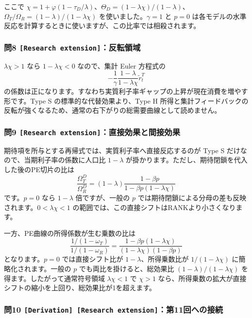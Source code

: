 \documentclass[
  japanese,
  lualatex,
  ja=standard,
  11pt,
  a4paper]{ltjsarticle}
\begin{document}
ここで
\(\chi=1+\varphi(1-\tau_D/\lambda)\)、\(\Theta_D=(1-\lambda\chi)/(1-\lambda)\)、\(\Omega_T/\Omega_R=(1-\lambda)/(1-\lambda\chi)\)
を使いました。\(\gamma=1\) と \(p=0\)
は各モデルの水準反応を計算するときに使いますが、この比率では相殺されます。

\subsubsection{\texorpdfstring{問8
\texttt{{[}Research\ extension{]}}：反転領域}{問8 {[}Research extension{]}：反転領域}}\label{ux554f8-research-extensionux53cdux8ee2ux9818ux57df}

\(\lambda\chi>1\) なら \(1-\lambda\chi<0\) なので、集計 Euler 方程式の
\[
-\frac1\gamma\frac{1-\lambda}{1-\lambda\chi}
\widetilde r_t^T
\]
の係数は正になります。すなわち実質利子率ギャップの上昇が現在消費を増やす形です。Type
S の標準的な代替効果より、Type H
所得と集計フィードバックの反転が強くなるため、通常の右下がりの総需要曲線として読めません。

\subsubsection{\texorpdfstring{問9
\texttt{{[}Research\ extension{]}}：直接効果と間接効果}{問9 {[}Research extension{]}：直接効果と間接効果}}\label{ux554f9-research-extensionux76f4ux63a5ux52b9ux679cux3068ux9593ux63a5ux52b9ux679c}

期待項を所与とする再帰式では、実質利子率へ直接反応するのが Type S
だけなので、当期利子率の係数に人口比 \(1-\lambda\)
が掛かります。ただし、期待閉鎖を代入した後のPE切片の比は \[
\frac{\Omega_T^D}{\Omega_R^D}
=(1-\lambda)\frac{1-\beta p}
{1-\beta p(1-\lambda\chi)}
\] です。\(p=0\) なら \(1-\lambda\) 倍ですが、一般の \(p\)
では期待閉鎖による分母の差も反映されます。\(0<\lambda\chi<1\)
の範囲では、この直接シフトはRANKより小さくなります。

一方、PE曲線の所得係数が生む乗数の比は \[
\frac{1/(1-\omega_T)}{1/(1-\omega_R)}
=\frac{1-\beta p(1-\lambda\chi)}
{(1-\lambda\chi)(1-\beta p)}
\] となります。\(p=0\) では直接シフト比が \(1-\lambda\)、所得乗数比が
\(1/(1-\lambda\chi)\) に簡略化されます。一般の \(p\)
でも両比を掛けると、総効果比 \((1-\lambda)/(1-\lambda\chi)\)
を得ます。したがって通常符号領域 \(\lambda\chi<1\) で \(\chi>1\)
なら、所得乗数の拡大が直接シフトの縮小を上回り、総効果比が1を超えます。

\clearpage

\subsubsection{\texorpdfstring{問10
\texttt{{[}Derivation{]}\ {[}Research\ extension{]}}：第11回への接続}{問10 {[}Derivation{]} {[}Research extension{]}：第11回への接続}}\label{ux554f10-derivation-research-extensionux7b2c11ux56deux3078ux306eux63a5ux7d9a}
\end{document}
